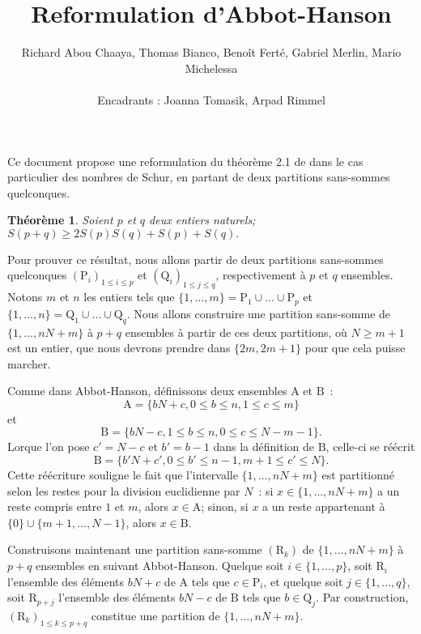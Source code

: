 \documentclass[11pt, oneside]{article}
\title{Reformulation d'Abbot-Hanson}
\author{Richard Abou Chaaya, Thomas Bianco, Benoît Ferté, Gabriel Merlin, Mario Michelessa \\ \\
Encadrants : Joanna Tomasik, Arpad Rimmel}
\date{}
\newtheorem{theoreme}{Théorème}
\begin{document}
\maketitle

Ce document propose une reformulation du théorème 2.1 de \cite{AbbotHanson} dans le cas particulier des nombres de Schur,
en partant de deux partitions sans-sommes quelconques.

\begin{theoreme}
Soient $p$ et $q$ deux entiers naturels; $S(p + q) \geqslant 2 S(p) S(q) + S(p) + S(q).$
\end{theoreme}

Pour prouver ce résultat, nous allons partir de deux partitions sans-sommes quelconques $(\mathrm{P}_i)_{1 \leqslant i \leqslant p}$
et $(\mathrm{Q}_i)_{1 \leqslant j \leqslant q}$, respectivement à $p$ et $q$ ensembles.
Notons $m$ et $n$ les entiers tels que $\{1, \dots, m\} = \mathrm{P}_1 \cup \dots \cup \mathrm{P}_p$
et $\{1, \dots, n\} = \mathrm{Q}_1 \cup \dots \cup \mathrm{Q}_q$.
Nous allons construire une partition sans-somme de $\{1, \dots, nN + m\}$ à $p+q$ ensembles à partir de ces deux partitions,
où $N \geqslant m + 1$ est un entier, que nous devrons prendre dans $\{2m, 2m+1\}$ pour que cela puisse marcher.

Comme dans Abbot-Hanson, définissons deux ensembles $\mathrm{A}$ et $\mathrm{B}$~:
\begin{equation}
 \mathrm{A} = \{ bN + c, 0 \leqslant b \leqslant n, 1 \leqslant c \leqslant m \}
\end{equation}
et
\begin{equation}
 \mathrm{B} = \{ bN - c, 1 \leqslant b \leqslant n, 0 \leqslant c \leqslant N-m-1 \}.
\end{equation}
Lorque l'on pose $c' = N - c$ et $b' = b-1$ dans la définition de $\mathrm{B}$, celle-ci se réécrit
\[ \mathrm{B} = \{ b'N + c', 0 \leqslant b' \leqslant n-1, m+1 \leqslant c' \leqslant N \}. \]
Cette réécriture souligne le fait que l'intervalle $\{1, \dots, nN + m \}$ est partitionné selon les restes pour la division euclidienne par $N$~:
si $x \in \{1, \dots, nN + m \}$ a un reste compris entre $1$ et $m$, alors $x \in \mathrm{A}$;
sinon, si $x$ a un reste appartenant à $\{0\} \cup \{m+1, \dots, N-1\}$, alors $x \in \mathrm{B}$.

Construisons maintenant une partition sans-somme $(\mathrm{R}_k)$ de $\{1, \dots, nN + m \}$ à $p+q$ ensembles en suivant Abbot-Hanson.
Quelque soit $i \in \{1, \dots, p\}$, soit $\mathrm{R}_i$ l'ensemble des éléments $bN + c$ de $\mathrm{A}$ tels que $c \in \mathrm{P}_i$,
et quelque soit $j \in \{1, \dots, q\}$, soit $\mathrm{R}_{p + j}$ l'ensemble des éléments $bN - c$ de $\mathrm{B}$ tels que $b \in \mathrm{Q}_j$.
Par construction, $(\mathrm{R}_k)_{1 \leqslant k \leqslant p+q}$ constitue une partition de $\{1, \dots, nN + m \}$.
\end{document}
